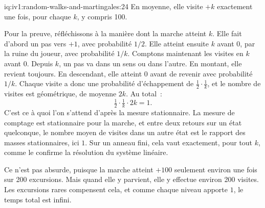 \begin{solution}{iq:iv1:random-walks-and-martingales:24}
En moyenne, elle visite $+k$ exactement une fois, pour chaque $k$, y compris 100.

Pour la preuve, réfléchissons à la manière dont la marche atteint $k$. Elle fait d'abord un pas vers $+1$, avec probabilité $1/2$. Elle atteint ensuite $k$ avant 0, par la ruine du joueur, avec probabilité $1/k$. Comptons maintenant les visites en $k$ avant 0. Depuis $k$, un pas va dans un sens ou dans l'autre. En montant, elle revient toujours. En descendant, elle atteint 0 avant de revenir avec probabilité $1/k$. Chaque visite a donc une probabilité d'échappement de $\tfrac12 \cdot \tfrac1k$, et le nombre de visites est géométrique, de moyenne $2k$. Au total~:
\[
\tfrac12 \cdot \tfrac1k \cdot 2k = 1.
\]
C'est ce à quoi l'on s'attend d'après la mesure stationnaire. La mesure de comptage est stationnaire pour la marche, et entre deux retours sur un état quelconque, le nombre moyen de visites dans un autre état est le rapport des masses stationnaires, ici $1$. Sur un anneau fini, cela vaut exactement, pour tout $k$, comme le confirme la résolution du système linéaire.

Ce n'est pas absurde, puisque la marche atteint $+100$ seulement environ une fois sur 200 excursions. Mais quand elle y parvient, elle y effectue environ 200 visites. Les excursions rares compensent cela, et comme chaque niveau apporte $1$, le temps total est infini.

\end{solution}

